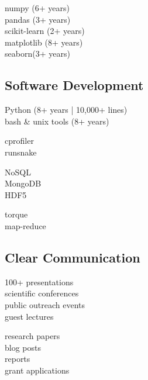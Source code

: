 \documentclass[]{winter-resume-openfont}
\begin{document}
\begin{minipage}[t]{0.29\textwidth}
\textbullet{} numpy (6+ years) \\ 
\textbullet{} pandas (3+ years) \\ 
\textbullet{} scikit-learn (2+ years) \\
\textbullet{} matplotlib (8+ years) \\ 
\textbullet{} seaborn(3+ years) \\
\sectionsep
\sectionsep

\subsection{Software Development}
\sectionsep

\textbullet{} Python (8+ years | 10,000+ lines)\\
\textbullet{}  bash \& unix tools (8+ years) \\
 \sectionsep

\textbullet{} cprofiler \\ 
\textbullet{} runsnake \\ 
\sectionsep

\textbullet{} NoSQL \\  
\textbullet{} MongoDB \\
\textbullet{} HDF5 \\ 
\sectionsep

\textbullet{} torque \\
\textbullet{} map-reduce \\
\sectionsep

\sectionsep

\subsection{Clear Communication}
\sectionsep

\textbullet{} 100+ presentations \\
\textbullet{} scientific conferences \\
\textbullet{} public outreach events \\
\textbullet{} guest lectures \\
\sectionsep

\textbullet{} research papers \\
\textbullet{} blog posts \\ 
\textbullet{} reports \\
\textbullet{} grant applications \\


\end{minipage}
\end{document}

